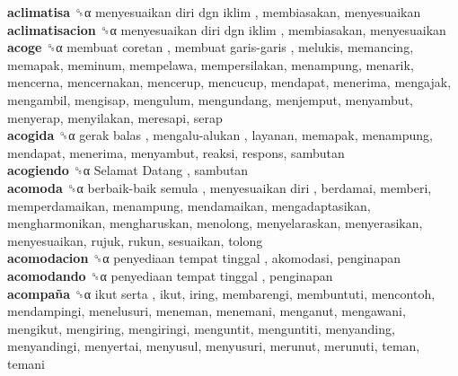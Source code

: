 \textbf{aclimatisa} ␝α   menyesuaikan diri dgn iklim , membiasakan, menyesuaikan  \\
\textbf{aclimatisacion} ␝α   menyesuaikan diri dgn iklim , membiasakan, menyesuaikan  \\
\textbf{acoge} ␝α   membuat coretan ,  membuat garis-garis , melukis, memancing, memapak, meminum, mempelawa, mempersilakan, menampung, menarik, mencerna, mencernakan, mencerup, mencucup, mendapat, menerima, mengajak, mengambil, mengisap, mengulum, mengundang, menjemput, menyambut, menyerap, menyilakan, meresapi, serap  \\
\textbf{acogida} ␝α   gerak balas ,  mengalu-alukan , layanan, memapak, menampung, mendapat, menerima, menyambut, reaksi, respons, sambutan  \\
\textbf{acogiendo} ␝α   Selamat Datang , sambutan  \\
\textbf{acomoda} ␝α   berbaik-baik semula ,  menyesuaikan diri , berdamai, memberi, memperdamaikan, menampung, mendamaikan, mengadaptasikan, mengharmonikan, mengharuskan, menolong, menyelaraskan, menyerasikan, menyesuaikan, rujuk, rukun, sesuaikan, tolong  \\
\textbf{acomodacion} ␝α   penyediaan tempat tinggal , akomodasi, penginapan  \\
\textbf{acomodando} ␝α   penyediaan tempat tinggal , penginapan  \\
\textbf{acompaña} ␝α   ikut serta , ikut, iring, membarengi, membuntuti, mencontoh, mendampingi, menelusuri, meneman, menemani, menganut, mengawani, mengikut, mengiring, mengiringi, menguntit, menguntiti, menyanding, menyandingi, menyertai, menyusul, menyusuri, merunut, merunuti, teman, temani  \\
